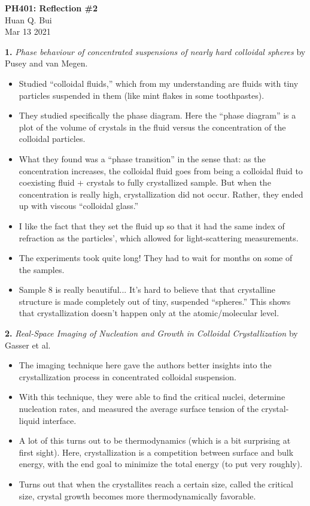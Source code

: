 \documentclass[11pt]{article}
\begin{document}
\begin{center}
{\large \bf PH401: Reflection \#2}\\
{ Huan Q. Bui}\\
Mar 13 2021
\end{center}
\noindent \textbf{1.} \textit{Phase behaviour of concentrated suspensions of nearly hard colloidal spheres} by Pusey and van Megen.
\begin{itemize}
	\item Studied ``colloidal fluids,'' which from my understanding are fluids with tiny particles suspended in them (like mint flakes in some toothpastes). 
	\item They studied specifically the phase diagram. Here the ``phase diagram'' is a plot of the volume of crystals in the fluid versus the concentration of the colloidal particles. 
	\item What they found was a ``phase transition'' in the sense that: as the concentration increases, the colloidal fluid goes from being a colloidal fluid to coexisting fluid + crystals to fully crystallized sample.  But when the concentration is really high, crystallization did not occur. Rather, they ended up with viscous ``colloidal glass.'' 
	\item I like the fact that they set the fluid up so that it had the same index of refraction as the particles', which allowed for light-scattering measurements. 
	\item The experiments took quite long! They had to wait for months on some of the samples.
	\item Sample 8 is really beautiful... It's hard to believe that that crystalline structure is made completely out of tiny, suspended ``spheres.'' This shows that crystallization doesn't happen only at the atomic/molecular level.
\end{itemize}


\noindent \textbf{2.}  \textit{Real-Space Imaging of Nucleation and Growth in Colloidal Crystallization} by Gasser et al. 
\begin{itemize}
	\item The imaging technique here gave the authors better insights into the crystallization process in concentrated colloidal suspension. 
	\item With this technique, they were able to find the critical nuclei, determine nucleation rates, and measured the average surface tension of the crystal-liquid interface. 
	\item A lot of this turns out to be thermodynamics (which is a bit surprising at first sight). Here, crystallization is a competition between surface and bulk energy, with the end goal to minimize the total energy (to put very roughly). 
	\item Turns out that when the crystallites reach a certain size, called the critical size, crystal growth becomes more thermodynamically favorable. 
\end{itemize}
\end{document}
